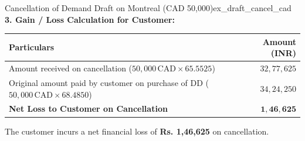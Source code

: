 \begin{example}{Cancellation of Demand Draft on Montreal (CAD 50,000)}{ex_draft_cancel_cad}
\noindent\textbf{3. Gain / Loss Calculation for Customer:}
\begin{center}
\small
\begin{tabularx}{\linewidth}{Xr}
\toprule
\textbf{Particulars} & \textbf{Amount (INR)} \\
\midrule
Amount received on cancellation ($50,000\,\text{CAD} \times 65.5525$) & $32,77,625$ \\
Original amount paid by customer on purchase of DD ($50,000\,\text{CAD} \times 68.4850$) & $34,24,250$ \\
\midrule
\textbf{Net Loss to Customer on Cancellation} & $\mathbf{1,46,625}$ \\
\bottomrule
\end{tabularx}
\end{center}
The customer incurs a net financial loss of \textbf{Rs. 1,46,625} on cancellation.
\end{example}


